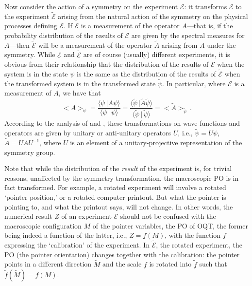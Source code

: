 \documentclass[12pt]{article}
\begin{document}
Now consider the action of a symmetry on the experiment ${\mathcal{E}}$: it transforms $\mathcal{E}$ to the experiment $\mathcal{\tilde{E}}$ arising from the natural action of the symmetry on the physical processes defining $\mathcal E$. If $\mathcal{E}$ is a measurement of the operator $A$---that is, if the probability distribution of the results of $\mathcal{E}$ are given by the spectral measures for $A$---then $\mathcal{\tilde{E}}$ will be a measurement of the operator $\tilde{A}$ arising from $A$ under the symmetry. While $\mathcal E$ and $\mathcal{\tilde{E}}$ are of course (usually) different experiments, it is obvious from their relationship that the distribution of the results of $\mathcal{E}$ when the system is in the state $\psi$ is the same as the distribution of the results of $\mathcal{\tilde{E}}$ when the transformed system is in the transformed state $\tilde{\psi}$. In particular, where $\mathcal{E}$ is a measurement of $A$, we have that 
\begin{equation} <A>_{\psi}=  \frac{\langle \psi\,| A\psi\rangle}{\langle\psi\,|\,\psi\rangle}
=   \frac{\langle \tilde{\psi}\,| \tilde{A}\tilde{\psi}\rangle}{\langle\tilde{\psi}\,|\,\tilde{\psi}\rangle} =<\tilde{A}>_{\tilde{\psi}} \, .
\label{meanv2}
\end{equation}
According to the analysis of \citet{wigner} and \citet{bargmann}, these  transformations  on wave functions and operators are given by  unitary or anti-unitary 
operators $U$, i.e.,  $\tilde{\psi}= U\psi$, $\tilde{A}= UAU^{-1}$,  where $U$ is an element of a unitary-projective representation of the symmetry group.

Note that while the distribution of the {\em result} of the experiment is, for trivial reasons, unaffected by the symmetry transformation, the macroscopic PO is in fact transformed. For example, a rotated experiment will involve a rotated `pointer position,' or a rotated computer printout. But what the pointer is pointing to, and what the printout says, will not change. 
In other words, the numerical result $Z$ of an experiment $\mathcal{E}$
should not be confused  with the macroscopic  configuration $M$ of the
pointer variables, the PO of {\sf OQT}, the former being indeed a function of the
latter,
i.e., $Z=f(M)$, with the function $f$ expressing  the `calibration' of the
experiment. In  $\mathcal{\tilde{E}}$, the rotated experiment, the
PO (the pointer orientation)  changes together with the calibration: the
pointer points in a different direction $\tilde{M}$ and the scale $f$  is
rotated into $\tilde{f}$ such that  $\tilde{f}(\tilde{M})=f(M)$.
\end{document}
